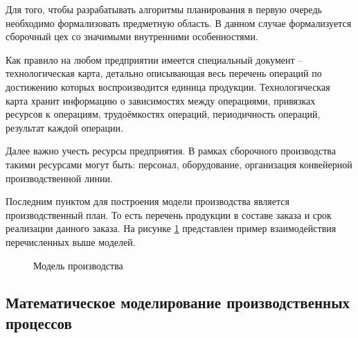 Для того, чтобы разрабатывать алгоритмы планирования в первую очередь необходимо формализовать предметную область. В данном случае формализуется сборочный цех со значимыми внутренними особенностями.

Как правило на любом предприятии имеется специальный документ – технологическая карта, детально описывающая весь перечень операций по достижению которых воспроизводится единица продукции. Технологическая карта хранит информацию о зависимостях между операциями, привязках ресурсов к операциям, трудоёмкостях операций, периодичность операций, результат каждой операции. 

Далее важно учесть ресурсы предприятия. В рамках сборочного производства такими ресурсами могут быть: персонал, оборудование, организация конвейерной производственной линии.

Последним пунктом для построения модели производства является производственный план. То есть перечень продукции в составе заказа и срок реализации данного заказа. На рисунке \ref{ris:Prod1} представлен пример взаимодействия перечисленных выше моделей. 

\begin{figure}[H]
    \caption{Модель производства}
    \label{ris:Prod1}
\end{figure}

\subsection{Математическое моделирование производственных процессов}

